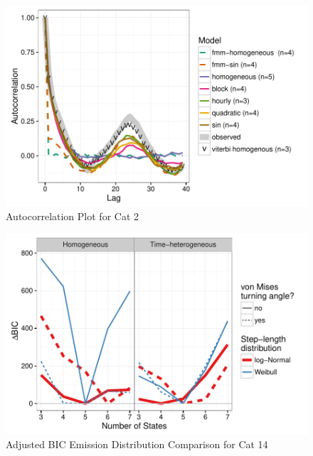 \documentclass{article}\usepackage[]{graphicx}\usepackage{xcolor}
\makeatletter
\def\maxwidth{ %
  \ifdim\Gin@nat@width>\linewidth
    \linewidth
  \else
    \Gin@nat@width
  \fi
}
\newenvironment{knitrout}{}{} %
\makeatother
\begin{document}
\begin{knitrout}
\color{fgcolor}\begin{figure}
\includegraphics[width=\maxwidth]{figure/acf_plot2-1} \caption[Autocorrelation Plot for Cat 2]{Autocorrelation Plot for Cat 2}\label{fig:acf_plot2}
\end{figure}


\end{knitrout}


\clearpage

\begin{knitrout}
\color{fgcolor}\begin{figure}
\includegraphics[width=\maxwidth]{figure/BICred_plot14-1} \caption[Adjusted BIC Emission Distribution Comparison for Cat 14]{Adjusted BIC Emission Distribution Comparison for Cat 14}\label{fig:BICred_plot14}
\end{figure}


\end{knitrout}
\end{document}
